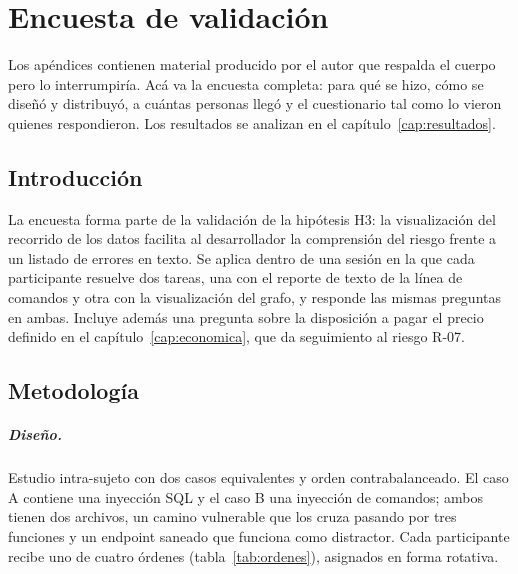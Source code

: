 
\chapter{Encuesta de validación}\label{apx:encuesta}

\begin{guia}
Los apéndices contienen material producido por el autor que respalda
el cuerpo pero lo interrumpiría. Acá va la encuesta completa: para qué
se hizo, cómo se diseñó y distribuyó, a cuántas personas llegó y el
cuestionario tal como lo vieron quienes respondieron. Los resultados
se analizan en el capítulo~\ref{cap:resultados}.
\end{guia}

\section{Introducción}

La encuesta forma parte de la validación de la hipótesis H3: la
visualización del recorrido de los datos facilita al desarrollador la
comprensión del riesgo frente a un listado de errores en texto. Se
aplica dentro de una sesión en la que cada participante resuelve dos
tareas, una con el reporte de texto de la línea de comandos y otra con
la visualización del grafo, y responde las mismas preguntas en ambas.
Incluye además una pregunta sobre la disposición a pagar el precio
definido en el capítulo~\ref{cap:economica}, que da seguimiento al
riesgo R-07.

\section{Metodología}

\paragraph{Diseño.} Estudio intra-sujeto con dos casos equivalentes y
orden contrabalanceado. El caso A contiene una inyección SQL y el caso B
una inyección de comandos; ambos tienen dos archivos, un camino
vulnerable que los cruza pasando por tres funciones y un endpoint
saneado que funciona como distractor. Cada participante recibe uno de
cuatro órdenes (tabla~\ref{tab:ordenes}), asignados en forma rotativa.

